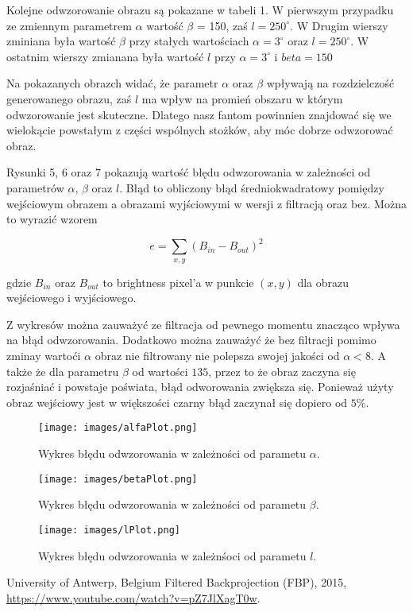 \documentclass{article}
\begin{document}
Kolejne odwzorowanie obrazu są pokazane w tabeli 1. W pierwszym przypadku ze zmiennym parametrem $\alpha$ wartość $\beta$ = 150, zaś $ l = 250^{\circ}$. W Drugim wierszy zminiana była wartość $\beta$ przy stałych wartościach $\alpha = 3^{\circ}$ oraz $ l = 250^{\circ}$. W ostatnim wierszy zmianana była wartość $l$ przy $\alpha = 3^{\circ}$ i $beta = 150$

Na pokazanych obrazch widać, że parametr $\alpha$ oraz $\beta$ wpływają na rozdzielczość generowanego obrazu, zaś $l$ ma wpływ na promień obszaru w którym odwzorowanie jest skuteczne. Dlatego nasz fantom powinnien znajdować się we wielokącie powstałym z części wspólnych stożków, aby móc dobrze odwzorować obraz.

Rysunki 5, 6 oraz 7 pokazują wartość błędu odwzorowania w zależności od parametrów $\alpha$, $\beta$ oraz $l$. Błąd to obliczony błąd średniokwadratowy pomiędzy wejściowym obrazem a obrazami wyjściowymi w wersji z filtracją oraz bez. Można to wyrazić wzorem

\[e = \sum\limits_{x,y} (B_{in} - B_{out})^2\]

gdzie $B_{in}$  oraz $B_{out}$ to brightness pixel'a w punkcie $(x,y)$ dla obrazu wejściowego i wyjściowego.

Z wykresów można zauważyć ze filtracja od pewnego momentu znacząco wpływa na błąd odwzorowania. Dodatkowo można zauważyć że bez filtracji pomimo zminay wartoći $\alpha$ obraz nie filtrowany nie polepsza swojej jakości od $\alpha<8$. A także że dla parametru $\beta$ od wartości $135$, przez to że obraz zaczyna się rozjaśniać i powstaje poświata, błąd odworowania zwiększa się. Ponieważ użyty obraz wejściowy jest w większości czarny błąd zaczynał się dopiero od $5\%$.
\begin{figure}
\texttt{[image: images/alfaPlot.png]} 
\caption{Wykres błędu odwzorowania w zależności od parametu $\alpha$.}
\end{figure}
\begin{figure}
\texttt{[image: images/betaPlot.png]}
\caption{Wykres błędu odwzorowania w zależności od parametu $\beta$.}
\end{figure}
\begin{figure}
\texttt{[image: images/lPlot.png]}
\caption{Wykres błędu odwzorowania w zależnśoci od parametu $l$.}
\end{figure}

\begin{thebibliography}{9}

 \hypertarget{ramlak}{} University of Antwerp, Belgium Filtered Backprojection (FBP), 2015, \url{https://www.youtube.com/watch?v=pZ7JlXagT0w}.

\end{thebibliography}
\end{document}
